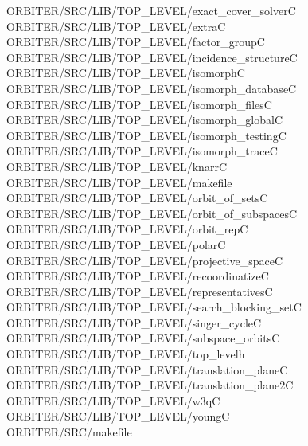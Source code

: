 \begin{tabbing}
ORBITER/SRC/LIB/TOP\_LEVEL/exact\_cover\_solverC\\[0pt]
ORBITER/SRC/LIB/TOP\_LEVEL/extraC\\[0pt]
ORBITER/SRC/LIB/TOP\_LEVEL/factor\_groupC\\[0pt]
ORBITER/SRC/LIB/TOP\_LEVEL/incidence\_structureC\\[0pt]
ORBITER/SRC/LIB/TOP\_LEVEL/isomorphC\\[0pt]
ORBITER/SRC/LIB/TOP\_LEVEL/isomorph\_databaseC\\[0pt]
ORBITER/SRC/LIB/TOP\_LEVEL/isomorph\_filesC\\[0pt]
ORBITER/SRC/LIB/TOP\_LEVEL/isomorph\_globalC\\[0pt]
ORBITER/SRC/LIB/TOP\_LEVEL/isomorph\_testingC\\[0pt]
ORBITER/SRC/LIB/TOP\_LEVEL/isomorph\_traceC\\[0pt]
ORBITER/SRC/LIB/TOP\_LEVEL/knarrC\\[0pt]
ORBITER/SRC/LIB/TOP\_LEVEL/makefile\\[0pt]
ORBITER/SRC/LIB/TOP\_LEVEL/orbit\_of\_setsC\\[0pt]
ORBITER/SRC/LIB/TOP\_LEVEL/orbit\_of\_subspacesC\\[0pt]
ORBITER/SRC/LIB/TOP\_LEVEL/orbit\_repC\\[0pt]
ORBITER/SRC/LIB/TOP\_LEVEL/polarC\\[0pt]
ORBITER/SRC/LIB/TOP\_LEVEL/projective\_spaceC\\[0pt]
ORBITER/SRC/LIB/TOP\_LEVEL/recoordinatizeC\\[0pt]
ORBITER/SRC/LIB/TOP\_LEVEL/representativesC\\[0pt]
ORBITER/SRC/LIB/TOP\_LEVEL/search\_blocking\_setC\\[0pt]
ORBITER/SRC/LIB/TOP\_LEVEL/singer\_cycleC\\[0pt]
ORBITER/SRC/LIB/TOP\_LEVEL/subspace\_orbitsC\\[0pt]
ORBITER/SRC/LIB/TOP\_LEVEL/top\_levelh\\[0pt]
ORBITER/SRC/LIB/TOP\_LEVEL/translation\_planeC\\[0pt]
ORBITER/SRC/LIB/TOP\_LEVEL/translation\_plane2C\\[0pt]
ORBITER/SRC/LIB/TOP\_LEVEL/w3qC\\[0pt]
ORBITER/SRC/LIB/TOP\_LEVEL/youngC\\[0pt]
ORBITER/SRC/makefile\\[0pt]
\end{tabbing}

